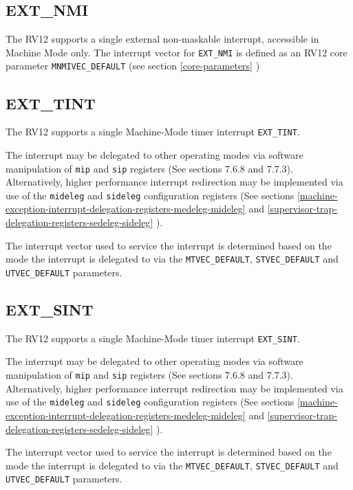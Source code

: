 \subsection{EXT\_NMI}\label{ext_nmi}

The RV12 supports a single external non-maskable interrupt, accessible
in Machine Mode only. The interrupt vector for \texttt{EXT\_NMI} is defined as an
RV12 core parameter \texttt{MNMIVEC\_DEFAULT} (see section \ref{core-parameters} )

\subsection{EXT\_TINT}\label{ext_tint}

The RV12 supports a single Machine-Mode timer interrupt \texttt{EXT\_TINT}.

The interrupt may be delegated to other operating modes via software
manipulation of \texttt{mip} and \texttt{sip} registers (See sections 7.6.8 and 7.7.3).
Alternatively, higher performance interrupt redirection may be
implemented via use of the \texttt{mideleg} and \texttt{sideleg} configuration registers
(See sections \ref{machine-exception-interrupt-delegation-registers-medeleg-mideleg} and \ref{supervisor-trap-delegation-registers-sedeleg-sideleg} ).

The interrupt vector used to service the interrupt is determined based
on the mode the interrupt is delegated to via the \texttt{MTVEC\_DEFAULT},
\texttt{STVEC\_DEFAULT} and \texttt{UTVEC\_DEFAULT} parameters.

\subsection{EXT\_SINT}\label{ext_sint}

The RV12 supports a single Machine-Mode timer interrupt \texttt{EXT\_SINT}.

The interrupt may be delegated to other operating modes via software
manipulation of \texttt{mip} and \texttt{sip} registers (See sections 7.6.8 and 7.7.3).
Alternatively, higher performance interrupt redirection may be
implemented via use of the \texttt{mideleg} and \texttt{sideleg} configuration registers
(See sections \ref{machine-exception-interrupt-delegation-registers-medeleg-mideleg} and \ref{supervisor-trap-delegation-registers-sedeleg-sideleg} ).

The interrupt vector used to service the interrupt is determined based
on the mode the interrupt is delegated to via the \texttt{MTVEC\_DEFAULT},
\texttt{STVEC\_DEFAULT} and \texttt{UTVEC\_DEFAULT} parameters.


